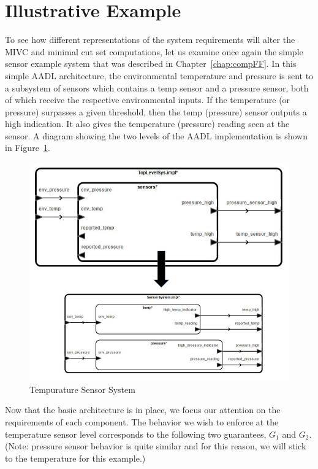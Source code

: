 \section{Illustrative Example}
\label{sec:granularityEx}
To see how different representations of the system requirements will alter the MIVC and minimal cut set computations, let us examine once again the simple sensor example system that was described in Chapter~\ref{chap:compFF}. In this simple AADL architecture, the environmental temperature and pressure is sent to a subsystem of sensors which contains a temp sensor and a pressure sensor, both of which receive the respective environmental inputs. If the temperature (or pressure) surpasses a given threshold, then the temp (pressure) sensor outputs a high indication. It also gives the temperature (pressure) reading seen at the sensor. A diagram showing the two levels of the AADL implementation is shown in Figure~\ref{fig:sensorGran1}.  

\begin{figure}[h]
\begin{center}
\includegraphics[width=14cm]{images/sensorGran.png}
\caption{Tempurature Sensor System} 
\label{fig:sensorGran1}
\end{center}
\end{figure}

Now that the basic architecture is in place, we focus our attention on the requirements of each component. The behavior we wish to enforce at the temperature sensor level corresponds to the following two guarantees, $G_1$ and $G_2$. (Note: pressure sensor behavior is quite similar and for this reason, we will stick to the temperature for this example.) 


